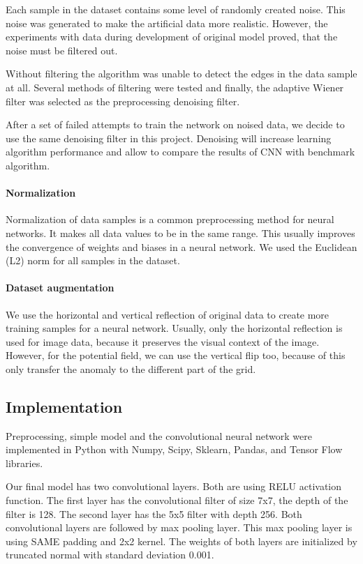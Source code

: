 \documentclass{article}
\begin{document}
Each sample in the dataset contains some level of randomly created
noise. This noise was generated to make the artificial data more
realistic. However, the experiments with data during development of
original model \cite{lenka} proved, that the noise must be filtered out. 

Without filtering the algorithm was unable to detect the edges in the data sample at all.
Several methods of filtering were tested and finally, the adaptive
Wiener filter was selected as the preprocessing denoising filter.

After a set of failed attempts to train the network on noised data, we
decide to use the same denoising filter in this project. Denoising will
increase learning algorithm performance and allow to compare the results
of CNN with benchmark algorithm.

\paragraph{Normalization}\label{normalization}

Normalization of data samples is a common preprocessing method for
neural networks. It makes all data values to be in the same range. This
usually improves the convergence of weights and biases in a neural
network. We used the Euclidean (L2) norm for all samples in the dataset.

\paragraph{Dataset augmentation}\label{dataset-augmentation}

We use the horizontal and vertical reflection of original data to create
more training samples for a neural network. Usually, only the horizontal
reflection is used for image data, because it preserves the visual
context of the image. However, for the potential field, we can use the
vertical flip too, because of this only transfer the anomaly to the
different part of the grid.

\subsection{Implementation}\label{implementation}

Preprocessing, simple model and the convolutional neural network were
implemented in Python with Numpy, Scipy, Sklearn, Pandas, and Tensor
Flow libraries.

Our final model has two convolutional layers. Both are using RELU
activation function. The first layer has the convolutional filter of
size 7x7, the depth of the filter is 128. The second layer has the 5x5
filter with depth 256. Both convolutional layers are followed by max
pooling layer. This max pooling layer is using SAME padding and 2x2
kernel. The weights of both layers are initialized by truncated normal
with standard deviation 0.001.
\end{document}
